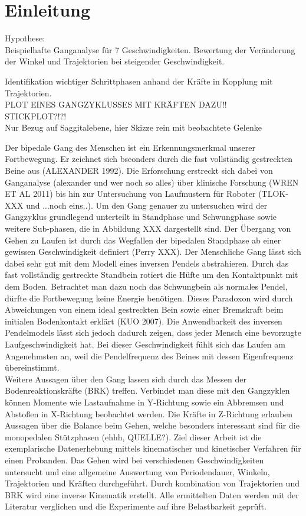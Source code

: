 \section{Einleitung}
Hypothese:\\
Beispielhafte Ganganalyse für 7 Geschwindigkeiten.
Bewertung der Veränderung der Winkel und Trajektorien bei steigender Geschwindigkeit.

Identifikation wichtiger Schrittphasen anhand der Kräfte in Kopplung mit Trajektorien.\\

PLOT EINES GANGZYKLUSSES MIT KRÄFTEN DAZU!!\\
STICKPLOT?!?!\\
Nur Bezug auf Saggitalebene, hier Skizze rein mit beobachtete Gelenke

Der bipedale Gang des Menschen ist ein Erkennungsmerkmal unserer Fortbewegung. Er zeichnet sich bseonders durch die fast vollständig gestreckten Beine aus (ALEXANDER 1992). Die Erforschung erstreckt sich dabei von Ganganalyse (alexander und wer noch so alles) über klinische Forschung (WREN ET AL 2011) bis hin zur Untersuchung von Laufmustern für Roboter (TLOK-XXX und ...noch eins..).
Um den Gang genauer zu untersuchen wird der Gangzyklus grundlegend unterteilt in Standphase und Schwungphase sowie weitere Sub-phasen, die in Abbildung XXX dargestellt sind. Der Übergang von Gehen zu Laufen ist durch das Wegfallen der bipedalen Standphase ab einer gewissen Geschwindigkeit definiert (Perry XXX).
Der Menschliche Gang lässt sich dabei sehr gut mit dem Modell eines inversen Pendels abstrahieren. Durch das fast vollständig gestreckte Standbein rotiert die Hüfte um den Kontaktpunkt mit dem Boden. Betrachtet man dazu noch das Schwungbein als normales Pendel, dürfte die Fortbewegung keine Energie benötigen. Dieses Paradoxon wird durch Abweichungen von einem ideal gestreckten Bein sowie einer Bremskraft beim initialen Bodenkontakt erklärt (KUO 2007). 
Die Anwendbarkeit des inversen Pendelmodels lässt sich jedoch dadurch zeigen, dass jeder Mensch eine bevorzugte Laufgeschwindigkeit hat. Bei dieser Geschwindigkeit fühlt sich das Laufen am Angenehmsten an, weil die Pendelfrequenz des Beines mit dessen Eigenfrequenz übereinstimmt.\\
Weitere Aussagen über den Gang lassen sich durch das Messen der Bodenreaktionskräfte (BRK) treffen. Verbindet man diese mit den Gangzyklen können Momente wie Lastaufnahme in Y-Richtung sowie ein Abbremsen und Abstoßen in X-Richtung beobachtet werden. Die Kräfte in Z-Richtung erlauben Aussagen über die Balance beim Gehen, welche besonders interessant sind für die monopedalen Stützphasen (ehhh, QUELLE?).
Ziel dieser Arbeit ist die exemplarische Datenerhebung mittels kinematischer und kinetischer Verfahren für einen Probanden. Das Gehen wird bei verschiedenen Geschwindigkeiten untersucht und eine allgemeine Auswertung von Periodendauer, Winkeln, Trajektorien und Kräften durchgeführt. Durch kombination von Trajektorien und BRK wird eine inverse Kinematik erstellt. Alle ermittelten Daten werden mit der Literatur verglichen und die Experimente auf ihre Belastbarkeit geprüft.

